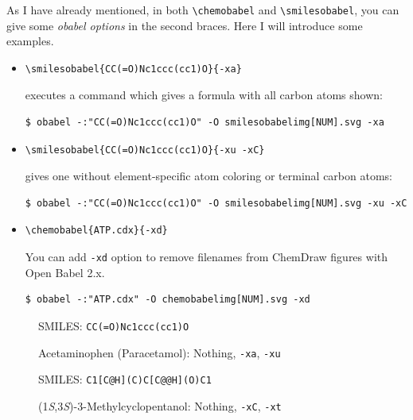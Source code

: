\documentclass[12pt]{ltjsarticle}
\def\Lcode#1{\texttt{#1}}
\def\Lmeta#1{\textit{#1}}
\begin{document}
As I have already mentioned, in both \verb|\chemobabel| and \verb|\smilesobabel|,
you can give some \Lmeta{obabel options} in the second braces.
Here I will introduce some examples.
\begin{itemize}
\item
\begin{verbatim}
\smilesobabel{CC(=O)Nc1ccc(cc1)O}{-xa}
\end{verbatim}
executes a command which gives a formula with all carbon atoms shown:
\begin{verbatim}
$ obabel -:"CC(=O)Nc1ccc(cc1)O" -O smilesobabelimg[NUM].svg -xa
\end{verbatim}
\item
\begin{verbatim}
\smilesobabel{CC(=O)Nc1ccc(cc1)O}{-xu -xC}
\end{verbatim}
gives one without element-specific atom coloring or terminal carbon atoms:
\begin{verbatim}
$ obabel -:"CC(=O)Nc1ccc(cc1)O" -O smilesobabelimg[NUM].svg -xu -xC
\end{verbatim}
\item
\begin{verbatim}
\chemobabel{ATP.cdx}{-xd}
\end{verbatim}
You can add \Lcode{-xd} option to remove filenames from ChemDraw figures with Open Babel 2.x.
\begin{verbatim}
$ obabel -:"ATP.cdx" -O chemobabelimg[NUM].svg -xd
\end{verbatim}
\end{itemize}

\begin{figure}[ht]
  \centering
   \hspace{1cm}
   \hspace{1cm}
  \caption{Acetaminophen (Paracetamol): Nothing, \Lcode{-xa}, \Lcode{-xu}}
  SMILES: \verb|CC(=O)Nc1ccc(cc1)O|
\end{figure}

\begin{figure}[ht]
  \centering
   \hspace{1cm}
   \hspace{1cm}
  \caption{(1\textit{S},3\textit{S})-3-Methylcyclopentanol: Nothing, \Lcode{-xC}, \Lcode{-xt}}
  SMILES: \verb|C1[C@H](C)C[C@@H](O)C1|
\end{figure}
\end{document}
